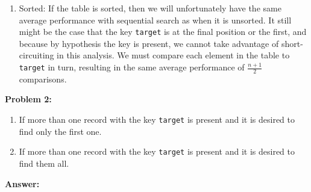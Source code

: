 \documentclass[10pt,letterpaper,final]{report}
\begin{document}
\begin{enumerate}
\begin{enumerate}
                \begin{align*}
                  \sum_{i=1}^{n}i & = \frac{n(n+1)}{2}
                \end{align*}
                Dividing this by the $n$ comparisons, we obtain the average number of comparisons required:
                \begin{align*}
                  \frac{n(n+1)}{2} * \frac{1}{n} & = \frac{n+1}{2}
                \end{align*}
          \item Sorted: If the table is sorted, then we will unfortunately have the same average performance with sequential search as when it is unsorted. It still might be the case that the key \texttt{target} is at the final position or the first, and because by hypothesis the key is present, we cannot take advantage of short-circuiting in this analysis. We must compare each element in the table to \texttt{target} in turn, resulting in the same average performance of $\frac{n+1}{2}$ comparisons.
        \end{enumerate}
\end{enumerate}

\pagebreak
\noindent\textbf{Problem 2:}
\medskip

\begin{enumerate}
  \item If more than one record with the key \texttt{target} is present and it is desired to find only the first one.
  \item If more than one record with the key \texttt{target} is present and it is desired to find them all.
\end{enumerate}


\medskip
\noindent\textbf{Answer:}
\medskip
\end{document}
